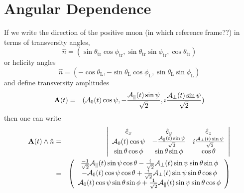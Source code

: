 \documentclass[a4paper,9pt,twoside]{article}
\def\thetatr{\theta_\mathrm{tr}}
\def\phitr{\phi_\mathrm{tr}}
\def\thetaL{\theta_\mathrm{L}}
\def\phiL{\phi_\mathrm{L}}
\begin{document}
\vfill
\pagebreak

\section{Angular Dependence}

If we write the direction of the positive muon (in which reference frame??) in terms of transversity angles,
\begin{equation}
  \hat{n} = ( \sin\thetatr\cos\phitr, \sin\thetatr\sin\phitr, \cos\thetatr )
\end{equation}
or helicity angles
\begin{equation}
  \hat{n} = ( -\cos\thetaL, -\sin\thetaL\cos\phiL, \sin\thetaL\sin\phiL )
\end{equation}
and define transversity amplitudes
\begin{eqnarray}
   {\bf A}(t)            &=&  ( {\cal A}_0(t) \cos\psi          , -\frac{{\cal A}_\parallel(t) \sin\psi}{\sqrt{2}}         ,i\frac{{\cal A}_\perp(t) \sin\psi}{\sqrt{2}}          )  %
\end{eqnarray}
then one can write
\begin{eqnarray}
  { \bf A}(t) \wedge \hat{n} &=& \left|  \begin{array}{ccc}  
                                        \hat{e}_x & \hat{e}_y & \hat{e}_z \\
                                        {\cal A}_0(t) \cos\psi & - \frac{{\cal A}_\parallel(t) \sin\psi }{\sqrt{2}} & i\frac{ {\cal A}_\perp(t)\sin\psi}{\sqrt{2}}\\
                                        \sin\theta\cos\phi & \sin\theta\sin\phi & \cos\theta 
                                    \end{array}\right|  \\
                          &=& \left(\begin{array}{c}
                                  \frac{-1}{\sqrt{2}} {\cal A}_\parallel(t) \sin\psi \cos\theta  -  \frac{i }{\sqrt{2}}{\cal A}_\perp(t)\sin\psi\sin\theta\sin\phi  \\
                                   -{\cal A}_0(t) \cos\psi\cos\theta  + \frac{i}{\sqrt{2}} {\cal A}_\perp(t)\sin\psi \sin\theta\cos\phi \\
                                   {\cal A}_0(t) \cos\psi \sin\theta\sin\phi       + \frac{1}{\sqrt{2}}{\cal A}_\parallel(t) \sin\psi \sin\theta\cos\phi 
                              \end{array} \right)
\end{eqnarray}
\end{document}
